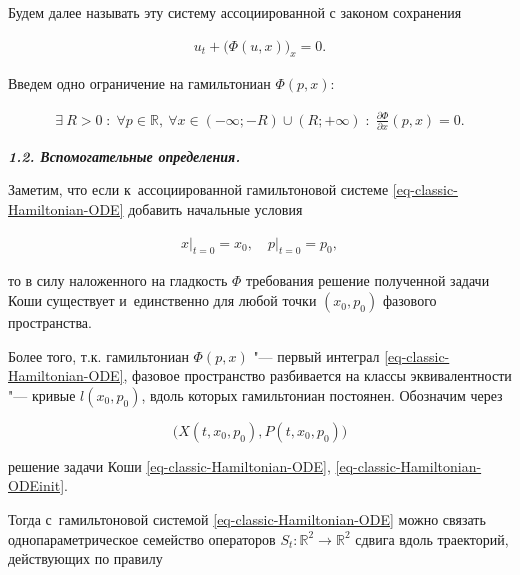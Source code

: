 Будем далее называть эту систему ассоциированной с законом сохранения

\begin{gather}

u_t+ \bigl(\Phi(u,x)\bigr)_x=0.\label{eq-classic-conservation-1}

\end{gather}

Введем одно ограничение на гамильтониан $\Phi(p,x)$:

\begin{gather}

\exists~ R>0\;:\;\forall p\in\mathbb{R},~\forall x\in(-\infty;-R)\cup(R;+\infty)\;:\;\frac{\partial\Phi}{\partial x}(p,x)=0.

\label{eq-classic-PsiCond}

\end{gather}



\smallskip



{\bf \itshape 1.2. Вспомогательные определения.}

Заметим, что если к~ассоциированной гамильтоновой системе \eqref{eq-classic-Hamiltonian-ODE} добавить  начальные условия

\begin{gather}

x\bigr|_{t=0}=x_0,\quad 

p\bigr|_{t=0}=p_0,

\label{eq-classic-Hamiltonian-ODEinit}

\end{gather}

то в силу наложенного на гладкость $\Phi$ требования  решение полученной задачи Коши существует и~единственно для любой точки $(x_0,p_0)$ фазового пространства. 

Более того, т.к. гамильтониан $\Phi(p,x)$ "--- первый интеграл \eqref{eq-classic-Hamiltonian-ODE}, фазовое пространство разбивается на классы эквивалентности "--- кривые $l(x_0,p_0)$, вдоль которых гамильтониан постоянен. Обозначим через

$$

\bigl(X(t,x_0,p_0),P(t,x_0,p_0)\bigr)

$$

решение задачи Коши \eqref{eq-classic-Hamiltonian-ODE}, \eqref{eq-classic-Hamiltonian-ODEinit}. 

Тогда с~гамильтоновой системой \eqref{eq-classic-Hamiltonian-ODE} можно связать однопараметрическое семейство операторов $S_t : \mathbb{R}^2\to\mathbb{R}^2$ сдвига вдоль траекторий, действующих по правилу

